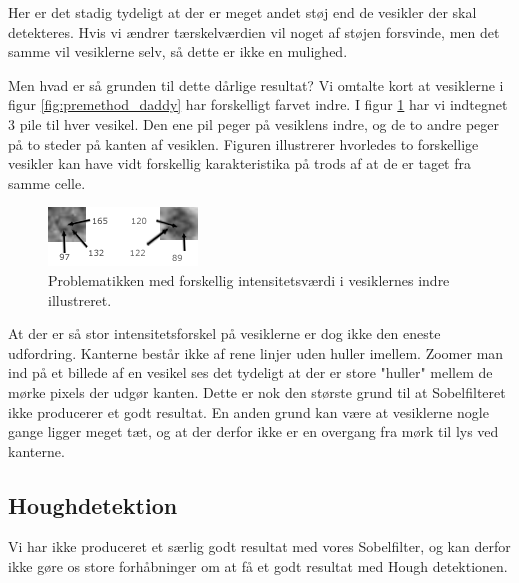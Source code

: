 Her er det stadig tydeligt at der er meget andet støj end de vesikler der skal detekteres. Hvis vi ændrer tærskelværdien vil noget af støjen forsvinde, men det samme vil vesiklerne selv, så dette er ikke en mulighed.

Men hvad er så grunden til dette dårlige resultat? Vi omtalte kort at vesiklerne i figur \ref{fig:premethod_daddy} har forskelligt farvet indre. I figur \ref{fig:premethod_vescolors} har vi indtegnet 3 pile til hver vesikel. Den ene pil peger på vesiklens indre, og de to andre peger på to steder på kanten af vesiklen.  Figuren illustrerer hvorledes to forskellige vesikler kan have vidt forskellig karakteristika på trods af at de er taget fra samme celle.

% 

\begin{figure}[H]
	\centering
	\includegraphics[scale=5]{files/premethod/img/ves_colors2.png}
	\caption{Problematikken med forskellig intensitetsværdi i vesiklernes indre illustreret.\label{fig:premethod_vescolors}}
\end{figure}

At der er så stor intensitetsforskel på vesiklerne er dog ikke den eneste udfordring. Kanterne består ikke af rene linjer uden huller imellem. Zoomer man ind på et billede af en vesikel ses det tydeligt at der er store "huller" mellem de mørke pixels der udgør kanten. Dette er nok den største grund til at Sobelfilteret ikke producerer et godt resultat. En anden grund kan være at vesiklerne nogle gange ligger meget tæt, og at der derfor ikke er en overgang fra mørk til lys ved kanterne.

\subsection{Houghdetektion}\label{premethod_hough}
Vi har ikke produceret et særlig godt resultat med vores Sobelfilter, og kan derfor ikke gøre os store forhåbninger om at få et godt resultat med Hough detektionen.

